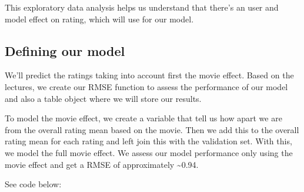 \documentclass[]{article}
\newenvironment{Shaded}{\begin{snugshade}}{\end{snugshade}}
\newcommand{\KeywordTok}[1]{\textcolor[rgb]{0.13,0.29,0.53}{\textbf{#1}}}
\newcommand{\DataTypeTok}[1]{\textcolor[rgb]{0.13,0.29,0.53}{#1}}
\newcommand{\DecValTok}[1]{\textcolor[rgb]{0.00,0.00,0.81}{#1}}
\newcommand{\StringTok}[1]{\textcolor[rgb]{0.31,0.60,0.02}{#1}}
\newcommand{\ControlFlowTok}[1]{\textcolor[rgb]{0.13,0.29,0.53}{\textbf{#1}}}
\newcommand{\OperatorTok}[1]{\textcolor[rgb]{0.81,0.36,0.00}{\textbf{#1}}}
\newcommand{\NormalTok}[1]{#1}
\begin{document}
This exploratory data analysis helps us understand that there's an user
and model effect on rating, which will use for our model.

\subsection{Defining our model}\label{defining-our-model}

We'll predict the ratings taking into account first the movie effect.
Based on the lectures, we create our RMSE function to assess the
performance of our model and also a table object where we will store our
results.

To model the movie effect, we create a variable that tell us how apart
we are from the overall rating mean based on the movie. Then we add this
to the overall rating mean for each rating and left join this with the
validation set. With this, we model the full movie effect. We assess our
model performance only using the movie effect and get a RMSE of
approximately \textasciitilde{}0.94.

See code below:

\begin{Shaded}
\end{Shaded}
\end{document}
